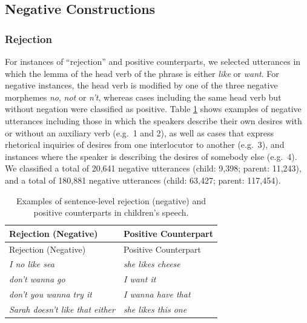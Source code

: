 \documentclass[
  english,
  man,floatsintext]{apa6}
\begin{document}
\hypertarget{negative-constructions}{%
\subsection{Negative Constructions}\label{negative-constructions}}

\hypertarget{rejection}{%
\subsubsection{Rejection}\label{rejection}}

For instances of ``rejection'' and positive counterparts, we selected utterances in which the lemma of the head verb of the phrase is either \emph{like} or \emph{want}. For negative instances, the head verb is modified by one of the three negative morphemes \emph{no}, \emph{not} or \emph{n't}, whereas cases including the same head verb but without negation were classified as positive. Table \ref{tab:rejection} shows examples of negative utterances including those in which the speakers describe their own desires with or without an auxiliary verb (e.g.~1 and 2), as well as cases that express rhetorical inquiries of desires from one interlocutor to another (e.g.~3), and instances where the speaker is describing the desires of somebody else (e.g.~4). We classified a total of 20,641 negative utterances (child: 9,398; parent: 11,243), and a total of 180,881 negative utterances (child: 63,427; parent: 117,454).

\begin{longtable}[]{@{}ll@{}}
\caption{\label{tab:rejection} Examples of sentence-level rejection (negative) and positive counterparts in children's speech.}\tabularnewline
\toprule
Rejection (Negative) & Positive Counterpart \\
\midrule
\endfirsthead
\toprule
Rejection (Negative) & Positive Counterpart \\
\midrule
\endhead
\emph{I no like sea} & \emph{she likes cheese} \\
\emph{don't wanna go} & \emph{I want it} \\
\emph{don't you wanna try it} & \emph{I wanna have that} \\
\emph{Sarah doesn't like that either} & \emph{she likes this one} \\
\bottomrule
\end{longtable}
\end{document}
